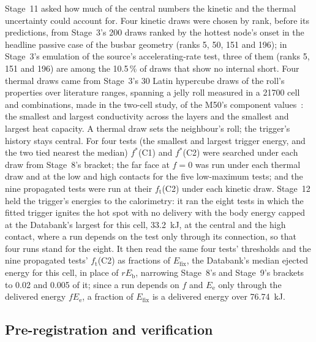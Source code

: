 \documentclass[preprint,12pt]{elsarticle}
\newcommand{\fs}{f^{*}}
\newcommand{\ft}{f_{\mathrm{t}}}
\newcommand{\Eb}{E_{\mathrm{b}}}
\newcommand{\Ee}{E_{\mathrm{e}}}
\begin{document}
Stage~11 asked how much of the central numbers the kinetic and the thermal uncertainty could account for. Four kinetic draws were chosen by rank, before its predictions, from Stage~3's 200 draws ranked by the hottest node's onset in the headline passive case of the busbar geometry (ranks 5, 50, 151 and 196); in Stage~3's emulation of the source's accelerating-rate test, three of them (ranks 5, 151 and 196) are among the 10.5\,\% of draws that show no internal short. Four thermal draws came from Stage~3's 30 Latin hypercube draws of the roll's properties over literature ranges, spanning a jelly roll measured in a 21700 cell~\cite{chen2021simplified} and combinations, made in the two-cell study, of the M50's component values~\cite{oregan2022thermal}: the smallest and largest conductivity across the layers and the smallest and largest heat capacity. A thermal draw sets the neighbour's roll; the trigger's history stays central. For four tests (the smallest and largest trigger energy, and the two tied nearest the median) $\fs$(C1) and $\fs$(C2) were searched under each draw from Stage~8's bracket; the far face at $f=0$ was run under each thermal draw and at the low and high contacts for the five low-maximum tests; and the nine propagated tests were run at their $\ft$(C2) under each kinetic draw. Stage~12 held the trigger's energies to the calorimetry: it ran the eight tests in which the fitted trigger ignites the hot spot with no delivery with the body energy capped at the Databank's largest for this cell, 33.2~kJ, at the central and the high contact, where a run depends on the test only through its connection, so that four runs stand for the eight. It then read the same four tests' thresholds and the nine propagated tests' $\ft$(C2) as fractions of $E_{\mathrm{fix}}$, the Databank's median ejected energy for this cell, in place of $r\Eb$, narrowing Stage~8's and Stage~9's brackets to 0.02 and 0.005 of it; since a run depends on $f$ and $\Ee$ only through the delivered energy $f\Ee$, a fraction of $E_{\mathrm{fix}}$ is a delivered energy over 76.74~kJ.

\subsection{Pre-registration and verification}
\label{sec:prereg}
\end{document}
